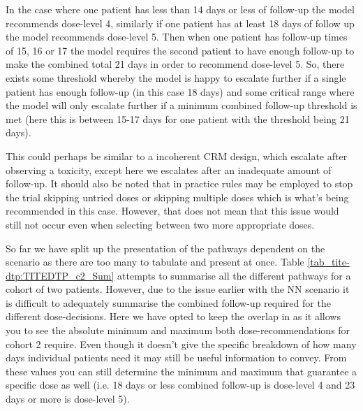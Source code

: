 In the case where one patient has less than 14 days or less of follow-up the model recommends dose-level 4, similarly if one patient has at least 18 days of follow up the model recommends dose-level 5. Then when one patient has follow-up times of 15, 16 or 17 the model requires the second patient to have enough follow-up to make the combined total 21 days in order to recommend dose-level 5. So, there exists some threshold whereby the model is happy to escalate further if a single patient has enough follow-up (in this case 18 days) and some critical range where the model will only escalate further if a minimum combined follow-up threshold is met (here this is between 15-17 days for one patient with the threshold being 21 days).

This could perhaps be similar to a incoherent CRM design, which escalate after observing a toxicity, except here we escalates after an inadequate amount of follow-up. It should also be noted that in practice rules may be employed to stop the trial skipping untried doses or skipping multiple doses which is what's being recommended in this case. However, that does not mean that this issue would still not occur even when selecting between two more appropriate doses. 

So far we have split up the presentation of the pathways dependent on the scenario as there are too many to tabulate and present at once. Table \ref{tab_tite-dtp:TITEDTP_c2_Sum} attempts to summarise all the different pathways for a cohort of two patients. However, due to the issue earlier with the NN scenario it is difficult to adequately summarise the combined follow-up required for the different dose-decisions. Here we have opted to keep the overlap in as it allows you to see the absolute minimum and maximum both dose-recommendations for cohort 2 require. Even though it doesn't give the specific breakdown of how many days individual patients need it may still be useful information to convey. From these values you can still determine the minimum and maximum that guarantee a specific dose as well (i.e. 18 days or less combined follow-up is dose-level 4 and 23 days or more is dose-level 5).


